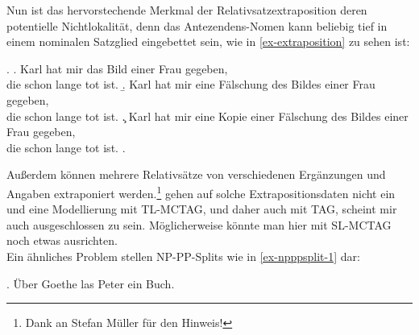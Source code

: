 Nun ist das hervorstechende Merkmal der Relativsatzextraposition deren potentielle Nichtlokalität, denn das Antezendens-Nomen kann beliebig tief in einem nominalen Satzglied eingebettet sein, wie in \ref{ex-extraposition} zu sehen ist:

\ex. \label{ex-extraposition}
\a. Karl hat mir das Bild einer Frau gegeben, \\ die schon lange tot ist.
\b. Karl hat mir eine Fälschung des Bildes einer Frau gegeben, \\ die schon lange tot ist.
\c. Karl hat mir eine Kopie einer Fälschung des Bildes einer Frau gegeben, \\ die schon lange tot ist.
\z. \citep[(13.18)]{Mueller:99}

Au\ss erdem können mehrere Relativsätze von verschiedenen Ergänzungen und Angaben extraponiert werden.\footnote{Dank an Stefan Müller für den Hinweis!} \cite{Kroch:Joshi:87} gehen auf solche Extrapositionsdaten nicht ein und eine Modellierung mit TL-MCTAG, und daher auch mit TAG, scheint mir auch ausgeschlossen zu sein. Möglicherweise könnte man hier mit SL-MCTAG noch etwas ausrichten. \\


Ein ähnliches Problem stellen NP-PP-Splits wie in \ref{ex-npppsplit-1} dar:

\ex. \label{ex-npppsplit-1} Über Goethe las Peter ein Buch. 

